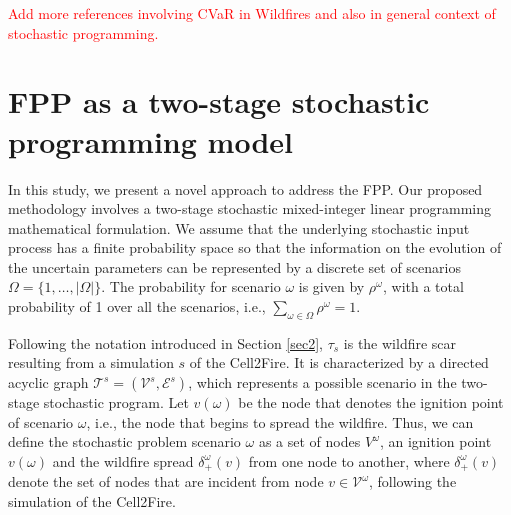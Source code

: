 \documentclass[a4paper,fleqn]{cas-sc}
\begin{document}
\textcolor{red}{Add more references involving CVaR in Wildfires and also in general context of stochastic programming.}

\section{FPP as a two-stage stochastic programming model}\label{s:general-model}

In this study, we present a novel approach to address the FPP. Our proposed methodology involves a two-stage stochastic mixed-integer linear programming mathematical formulation.  We assume that the underlying stochastic input process has a finite probability space so that the information on the evolution of the uncertain parameters can be represented by a discrete set of scenarios $\Omega = \{ 1,\dots, |\Omega|\}$. The probability for scenario $\omega$ is given by $\rho^\omega$, with a total probability of 1 over all the scenarios, i.e., $\sum_{\omega \in \Omega} \rho^\omega = 1$.

Following the notation introduced in Section \ref{sec2}, $\tau_s$ is the wildfire scar resulting from a simulation $s$ of the Cell2Fire. It is characterized by a directed acyclic graph $\mathcal{T}^s=(\mathcal{V}^s,\mathcal{E}^s)$, which represents a possible scenario in the two-stage stochastic program. Let $v(\omega)$ be the node that denotes the ignition point of scenario $\omega$, i.e., the node that begins to spread the wildfire. Thus, we can define the  stochastic problem scenario $\omega$ as a set of nodes $V^\omega$, an ignition point $v(\omega)$ and  the wildfire spread $\delta^\omega_+(v)$ from one node to another, where $\delta^{\omega}_{+}(v)$ denote the set of nodes that are incident from node $v \in \mathcal{V}^\omega$,  following the simulation of the Cell2Fire.
\end{document}
